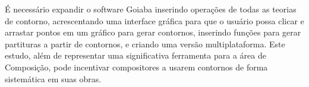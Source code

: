 
É necessário expandir o software Goiaba inserindo operações de todas
as teorias de contorno, acrescentando uma interface gráfica para que o
usuário possa clicar e arrastar pontos em um gráfico para gerar
contornos, inserindo funções para gerar partituras a partir de
contornos, e criando uma versão multiplataforma. Este estudo, além de
representar uma significativa ferramenta para a área de Composição,
pode incentivar compositores a usarem contornos de forma sistemática
em suas obras.

